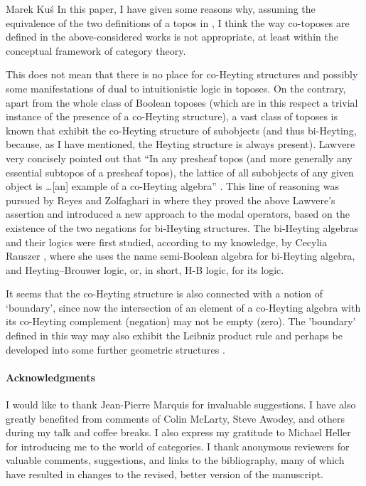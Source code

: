 \begin{artengenv}{Marek Ku\'s}
In this paper, I have given some reasons why, assuming the equivalence of the two definitions of a topos in \parencite[p.161f and 163]{maclane-moerdijk-1994}, I think the way co-toposes are defined in the above-considered works \parencite{mortensen-1995, mortensen-2003, james-phd-1996, estrada-gonzalez-2010, estrada-gonzalez-2015} is not appropriate, at least within the conceptual framework of category theory.

This does not mean that there is no place for co-Heyting structures and possibly some manifestations of dual to intuitionistic logic in toposes. On the contrary, apart from the whole class of Boolean toposes (which are in this respect a trivial instance of the presence of a co-Heyting structure), a vast class of toposes is known that exhibit the co-Heyting structure of subobjects (and thus bi-Heyting, because, as I have mentioned, the Heyting structure is always present). Lawvere \parencite*{lawvere-1991} very concisely pointed out that ``In any presheaf topos (and more generally any essential subtopos of a presheaf topos), the lattice of all subobjects of any given object is \ldots [an] example of a co-Heyting algebra'' \parencite[p.280]{lawvere-1991}. This line of reasoning was pursued by Reyes and Zolfaghari in \parencite{reyes-zolfaghari-1996} where they proved the above Lawvere's assertion and introduced a new approach to the modal operators, based on the existence of the two negations for bi-Heyting structures. The bi-Heyting algebras and their logics were first studied, according to my knowledge, by Cecylia Rauszer \parencite*{rauszer-1974, rauszer-1974-2}, where she uses the name semi-Boolean algebra for bi-Heyting algebra, and Heyting--Brouwer logic, or, in short, H-B logic, for its logic. 


It seems that the co-Heyting structure is also connected with a notion of `boundary', since now the intersection of an element of a co-Heyting algebra with its co-Heyting complement (negation) may not be empty (zero). The 'boundary' defined in this way %
may also exhibit the Leibniz product rule and perhaps be developed into some further geometric structures \parencites[cf.][]{lawvere-1991}[especially pp.123--126]{majid-2012}.


\paragraph{Acknowledgments}
I would like to thank Jean-Pierre Marquis for invaluable suggestions. I have also greatly benefited from comments of Colin McLarty, Steve Awodey, and others during my talk and coffee breaks. I also express my gratitude to Michael Heller for introducing me to the world of categories. I thank anonymous reviewers for valuable comments, suggestions, and links to the bibliography, many of which have resulted in changes to the revised, better version of the manuscript.


\end{artengenv}
